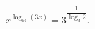\begin{ex}[type=equation]
	\begin{condition}
		$x^{\log_{64} (3x)} = 3$\tiny$^{\dfrac{1}{\log_3 2}}$\normalsize$.$
	\end{condition}
\end{ex}